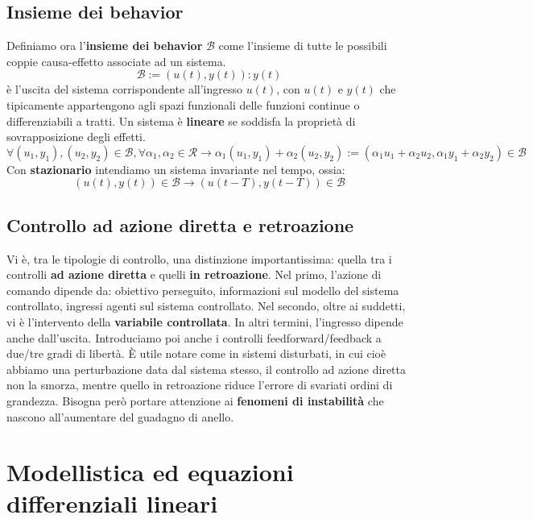 \documentclass[11pt]{article}
\begin{document}
\subsection{Insieme dei behavior}
Definiamo ora l'\textbf{insieme dei behavior} $\mathcal{B}$ come l'insieme di tutte le possibili coppie causa-effetto associate ad un sistema.
\begin{displaymath}
    \mathcal{B}:={\left( u(t), y(t) \right) : y(t)}
\end{displaymath}
è l'uscita del sistema corrispondente all'ingresso $u(t)$, con $u(t)$ e $y(t)$ che tipicamente appartengono agli spazi funzionali delle funzioni continue o differenziabili a tratti. 
Un sistema è \textbf{lineare} se soddisfa la proprietà di sovrapposizione degli effetti. 
\begin{displaymath}
    \forall (u_1,y_1), (u_2, y_2) \in \mathcal{B}, \forall \alpha_1,\alpha_2 \in \mathcal{R} \rightarrow \alpha_1(u_1,y_1)+\alpha_2(u_2, y_2) := (\alpha_1 u_1+ \alpha_2 u_2, \alpha_1y_1 + \alpha_2 y_2) \in \mathcal{B}
\end{displaymath}
Con \textbf{stazionario} intendiamo un sistema invariante nel tempo, ossia:
\begin{displaymath}
    \left(u(t), y(t)\right) \in \mathcal{B} \rightarrow \left(u(t-T), y(t-T)\right) \in \mathcal{B}
\end{displaymath}
\subsection{Controllo ad azione diretta e retroazione}
Vi è, tra le tipologie di controllo, una distinzione importantissima: quella tra i controlli \textbf{ad azione diretta} e quelli \textbf{in retroazione}. 
Nel primo, l'azione di comando dipende da: obiettivo perseguito, informazioni sul modello del sistema controllato, ingressi agenti sul sistema controllato. Nel secondo, oltre ai suddetti, vi è l'intervento della \textbf{variabile controllata}. In altri termini, l'ingresso dipende anche dall'uscita. Introduciamo poi anche i controlli feedforward/feedback a due/tre gradi di libertà. 
È utile notare come in sistemi disturbati, in cui cioè abbiamo una perturbazione data dal sistema stesso, il controllo ad azione diretta non la smorza, mentre quello in retroazione riduce l'errore di svariati ordini di grandezza. Bisogna però portare attenzione ai \textbf{fenomeni di instabilità} che nascono all'aumentare del guadagno di anello. 
\section{Modellistica ed equazioni differenziali lineari}
\end{document}
